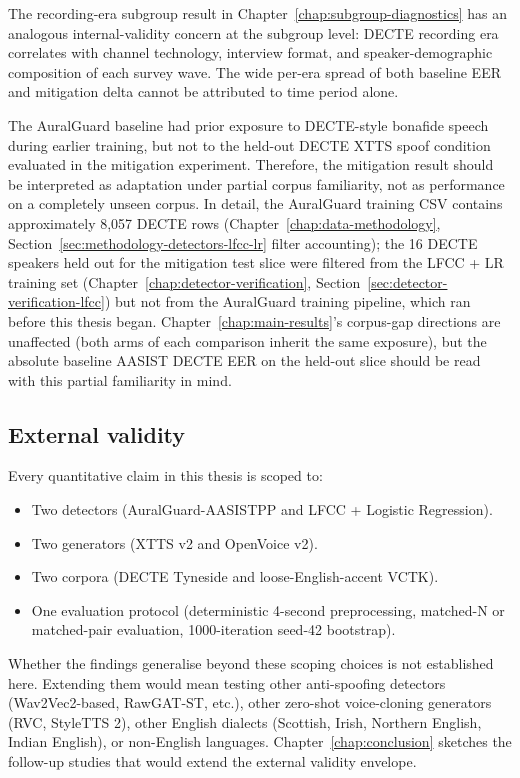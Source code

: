 The recording-era subgroup result in Chapter~\ref{chap:subgroup-diagnostics} has an analogous
internal-validity concern at the subgroup level: DECTE recording
era correlates with channel technology, interview format, and
speaker-demographic composition of each survey wave. The wide
per-era spread of both baseline EER and mitigation delta cannot
be attributed to time period alone.

The AuralGuard baseline had prior exposure to DECTE-style
bonafide speech during earlier training, but not to the held-out
DECTE XTTS spoof condition evaluated in the mitigation
experiment. Therefore, the mitigation result should be
interpreted as adaptation under partial corpus familiarity,
not as performance on a completely unseen corpus. In detail,
the AuralGuard training CSV contains approximately 8,057 DECTE
rows (Chapter~\ref{chap:data-methodology}, Section~\ref{sec:methodology-detectors-lfcc-lr} filter accounting); the 16
DECTE speakers held out for the mitigation test slice were
filtered from the LFCC + LR training set (Chapter~\ref{chap:detector-verification},
Section~\ref{sec:detector-verification-lfcc}) but not from the AuralGuard training pipeline,
which ran before this thesis began. Chapter~\ref{chap:main-results}'s corpus-gap
directions are unaffected (both arms of each comparison inherit
the same exposure), but the absolute baseline AASIST DECTE
EER on the held-out slice should be read with this partial
familiarity in mind.

\subsection{External validity}
\label{sec:discussion-external-validity}

Every quantitative claim in this thesis is scoped to:

\begin{itemize}
    \item Two detectors (AuralGuard-AASISTPP and LFCC + Logistic
        Regression).
    \item Two generators (XTTS v2 and OpenVoice v2).
    \item Two corpora (DECTE Tyneside and loose-English-accent VCTK).
    \item One evaluation protocol (deterministic 4-second preprocessing,
        matched-N or matched-pair evaluation, 1000-iteration seed-42
        bootstrap).
\end{itemize}

Whether the findings generalise beyond these scoping choices is
not established here. Extending them would mean testing other
anti-spoofing detectors (Wav2Vec2-based, RawGAT-ST, etc.), other
zero-shot voice-cloning generators (RVC, StyleTTS 2), other
English dialects (Scottish, Irish, Northern English, Indian
English), or non-English languages. Chapter~\ref{chap:conclusion} sketches the
follow-up studies that would extend the external validity envelope.

